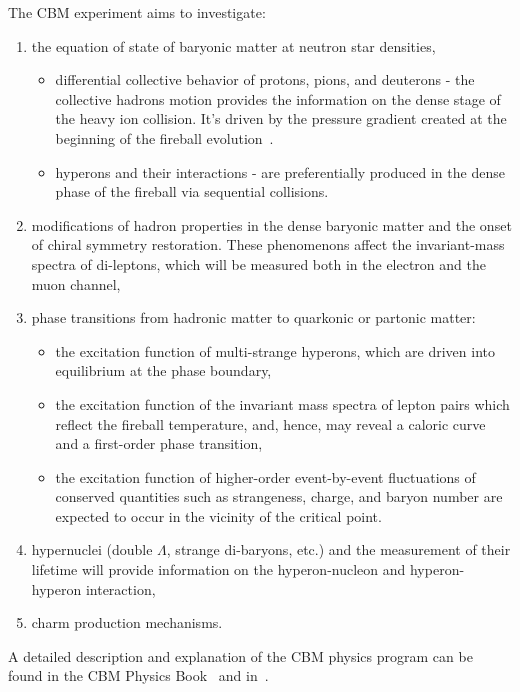 The \gls{CBM} experiment aims to investigate:
\begin{enumerate}
    \item the equation of state of baryonic matter at neutron star densities,
    \begin{itemize}
        \item differential collective behavior of protons, pions, and deuterons - the collective hadrons motion provides the information on the dense stage of the heavy ion collision. It's driven by the pressure gradient created at the beginning of the fireball evolution~\cite{Reisdorf_2007}.
        \item hyperons and their interactions - are preferentially produced in the dense phase of the fireball via sequential collisions.
    \end{itemize}
    \item modifications of hadron properties in the dense baryonic matter and the onset of chiral symmetry restoration. These phenomenons affect the invariant-mass spectra of di-leptons, which will be measured both in the electron and the muon channel,
    \item phase transitions from hadronic matter to quarkonic or partonic matter:
    \begin{itemize}
        \item the excitation function of multi-strange hyperons, which are driven into equilibrium at the phase boundary,
        \item the excitation function of the invariant mass spectra of lepton pairs which reflect the fireball temperature, and, hence, may reveal a caloric curve and a first-order phase transition,
        \item the excitation function of higher-order event-by-event fluctuations of conserved quantities such as strangeness, charge, and baryon number are expected to occur in the vicinity of the critical point.
    \end{itemize}
    \item hypernuclei (double $\Lambda$, strange di-baryons, etc.) and the measurement of their lifetime will provide information on the hyperon-nucleon and hyperon-hyperon interaction,
    \item charm production mechanisms.
\end{enumerate}
A detailed description and explanation of the \gls{CBM} physics program can be found in the \gls{CBM} Physics Book~\cite{CBM_physics} and in~\cite{Ablyazimov_2017}.




